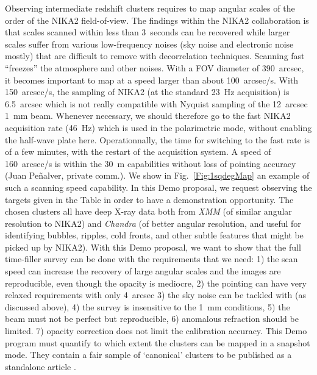 \documentclass[10pt,a4paper,twoside,graphicx,color]{article}
\begin{document}
\vspace{-0.1cm}  Observing intermediate redshift clusters requires to map
angular scales of the order of the NIKA2 field-of-view. The findings
within the NIKA2 collaboration is that scales scanned within less than
3~seconds can be recovered while larger scales suffer from various
low-frequency noises (sky noise and electronic noise mostly) that are
difficult to remove with decorrelation techniques. Scanning fast
``freezes'' the atmosphere and other noises. With a FOV diameter of
390~arcsec, it becomes important to map at a speed larger than about
100~arcsec/s. With 150~arcsec/s, the sampling of NIKA2 (at the
standard 23~Hz acquisition) is 6.5~arcsec which is not really
compatible with Nyquist sampling of the 12~arcsec 1~mm beam. Whenever
necessary, we should therefore go to the fast NIKA2 acquisition rate
(46~Hz) which is used in the polarimetric mode, without enabling the
half-wave plate here. Operationnally, the time for switching to the
fast rate is of a few minutes, with the restart of the acquisition
system. A speed of 160~arcsec/s is within the 30~m capabilities
without loss of pointing accuracy (Juan Peñalver, private comm.). We
show in Fig.~\ref{Fig:1sqdegMap} an example of such a scanning speed
capability. In this Demo proposal, we request observing the targets
given in the Table in order to have a demonstration opportunity. The
chosen clusters all have deep X-ray data both from {\sl XMM} (of
similar angular resolution to NIKA2) and {\sl Chandra} (of better
angular resolution, and useful for identifying bubbles, ripples, cold
fronts, and other subtle features that might be picked up by
NIKA2). With this Demo proposal, we want to show that the full
time-filler survey can be done with the requirements that we need: 1)
the scan speed can increase the recovery of large angular scales and
the images are reproducible, even though the opacity is mediocre, 2)
the pointing can have very relaxed requirements with only 4~arcsec 3)
the sky noise can be tackled with (as discussed above), 4) the survey
is insensitive to the 1~mm conditions, 5) the beam must not be perfect
but reproducible, 6) anomalous refraction should be limited. 7)
opacity correction does not limit the calibration accuracy. This Demo
program must quantify to which extent the clusters can be mapped in a
snapshot mode. They contain a fair sample of `canonical' clusters to
be published as a standalone article .
\end{document}
